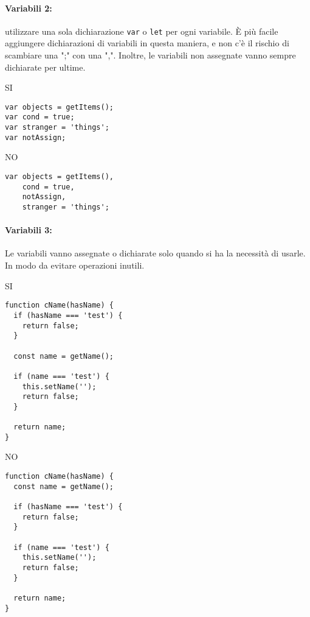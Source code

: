 \documentclass[../ProcessiPrimari.tex]{subfiles}
\begin{document}
\paragraph{Variabili 2:}utilizzare una sola dichiarazione \texttt{var} o \texttt{let} per ogni variabile. È più facile aggiungere dichiarazioni di variabili in questa maniera, e non c'è il rischio di scambiare una ";" con una ",". Inoltre, le variabili non assegnate vanno sempre dichiarate per ultime.

\begin{center}{
\begin{minipage}{6cm}
	{\begin{center}SI\end{center}}
	\begin{Verbatim}[frame=single]
var objects = getItems();
var cond = true;
var stranger = 'things';
var notAssign;
	\end{Verbatim}
\end{minipage}
\hfil
\begin{minipage}{6.5cm}
	{\begin{center}NO\end{center}}
	\begin{Verbatim}[frame=single]
var objects = getItems(),
	cond = true,
	notAssign,
	stranger = 'things';
	\end{Verbatim}
\end{minipage}
}
\end{center}

\paragraph{Variabili 3:}Le variabili vanno assegnate o dichiarate solo quando si ha la necessità di usarle. In modo da evitare operazioni inutili.
\begin{center}{
\begin{minipage}{6cm}
	{\begin{center}SI\end{center}}
	\begin{Verbatim}[frame=single]
function cName(hasName) {
  if (hasName === 'test') {
    return false;
  }

  const name = getName();

  if (name === 'test') {
    this.setName('');
    return false;
  }

  return name;
}
	\end{Verbatim}
\end{minipage}
\hfil
\begin{minipage}{6cm}
	{\begin{center}NO\end{center}}
	\begin{Verbatim}[frame=single]
function cName(hasName) {
  const name = getName();

  if (hasName === 'test') {
    return false;
  }

  if (name === 'test') {
    this.setName('');
    return false;
  }

  return name;
}	
\end{Verbatim}
\end{minipage}
}
\end{center}
\end{document}
